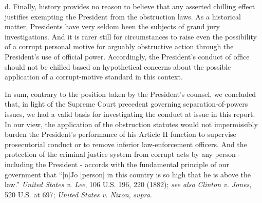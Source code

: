 d. Finally, history provides no reason to believe that any asserted chilling effect justifies exempting the President from the obstruction laws.
As a historical matter, Presidents have very seldom been the subjects of grand jury investigations.
And it is rarer still for circumstances to raise even the possibility of a corrupt personal motive for arguably obstructive action through the President’s use of official power.
Accordingly, the President’s conduct of office should not be chilled based on hypothetical concerns about the possible application of a corrupt-motive standard in this context.

\hr

In sum, contrary to the position taken by the President’s counsel, we concluded that, in light of the Supreme Court precedent governing separation-of-powers issues, we had a valid basis for investigating the conduct at issue in this report.
In our view, the application of the obstruction statutes would not impermissibly burden the President’s performance of his Article II function to supervise prosecutorial conduct or to remove inferior law-enforcement officers.
And the protection of the criminal justice system from corrupt acts by any person - including the President - accords with the fundamental principle of our government that “[n]Jo [person] in this country is so high that he is above the law.”
\textit{United States v. Lee}, 106 U.S. 196, 220 (1882);
\textit{see also Clinton v. Jones}, 520 U.S. at 697;
\textit{United States v. Nixon}, \textit{supra}.
